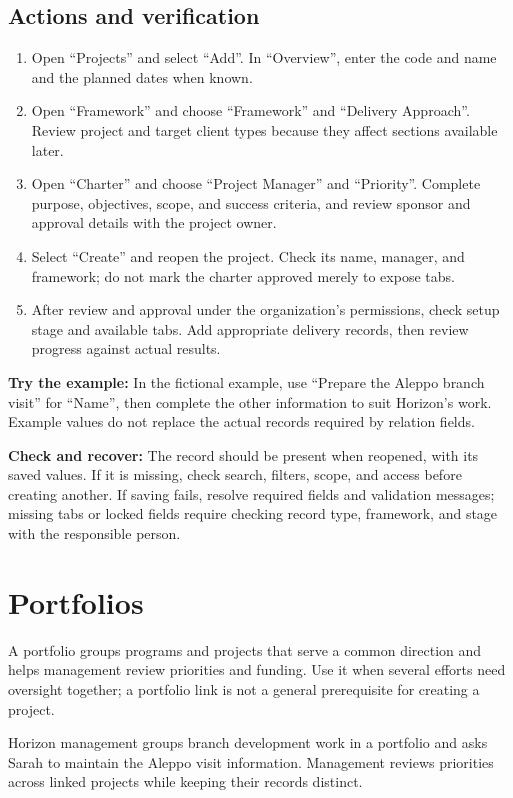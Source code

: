 \subsection{Actions and verification}
\begin{enumerate}
\item Open “Projects” and select “Add”. In “Overview”, enter the code and name and the planned dates when known.
\item Open “Framework” and choose “Framework” and “Delivery Approach”. Review project and target client types because they affect sections available later.
\item Open “Charter” and choose “Project Manager” and “Priority”. Complete purpose, objectives, scope, and success criteria, and review sponsor and approval details with the project owner.
\item Select “Create” and reopen the project. Check its name, manager, and framework; do not mark the charter approved merely to expose tabs.
\item After review and approval under the organization’s permissions, check setup stage and available tabs. Add appropriate delivery records, then review progress against actual results.
\end{enumerate}

\textbf{Try the example:} In the fictional example, use “Prepare the Aleppo branch visit” for “Name”, then complete the other information to suit Horizon's work. Example values do not replace the actual records required by relation fields.

\textbf{Check and recover:} The record should be present when reopened, with its saved values. If it is missing, check search, filters, scope, and access before creating another. If saving fails, resolve required fields and validation messages; missing tabs or locked fields require checking record type, framework, and stage with the responsible person.

\clearpage
\section{Portfolios}
\label{sec:projects-feature-portfolios}

A portfolio groups programs and projects that serve a common direction and helps management review priorities and funding. Use it when several efforts need oversight together; a portfolio link is not a general prerequisite for creating a project.

\begin{rcnote}
Horizon management groups branch development work in a portfolio and asks Sarah to maintain the Aleppo visit information. Management reviews priorities across linked projects while keeping their records distinct.
\end{rcnote}


